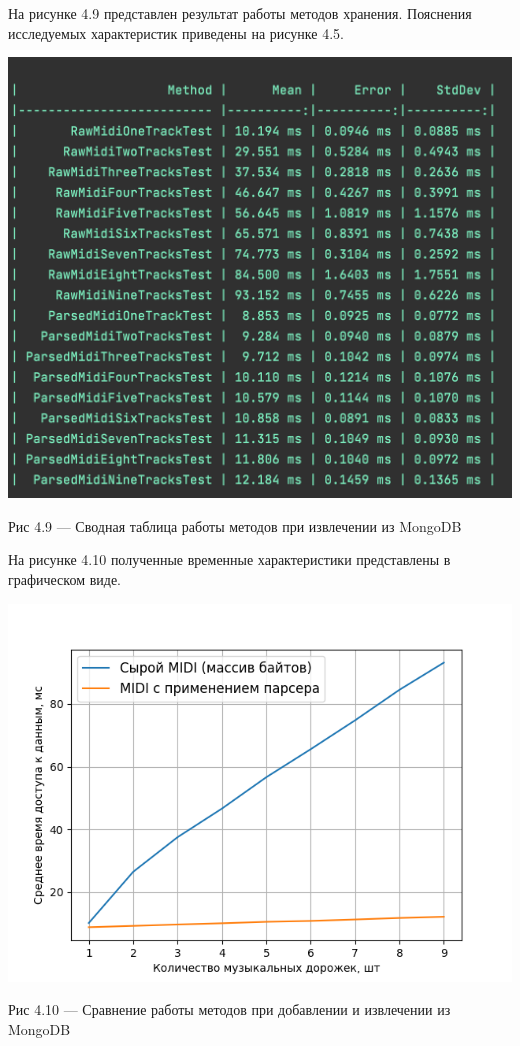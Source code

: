 На рисунке 4.9 представлен результат работы методов хранения. Пояснения исследуемых характеристик приведены на рисунке 4.5.

\begin{center}
		\includegraphics[scale=0.6]{tex/img/InsertFindClean.png}
		
			Рис 4.9 — Сводная таблица работы методов при извлечении из MongoDB
\end{center}

На рисунке 4.10 полученные временные характеристики представлены в графическом виде.

\begin{center}
		\includegraphics[scale=0.7]{tex/img/figure_find_insert_query.png}
		
			Рис 4.10 — Сравнение работы методов при добавлении и извлечении из MongoDB
\end{center}

